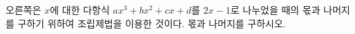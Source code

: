 \noindent\begin{minipage}[t]{0.6\linewidth}\vspace{0pt}\raggedright 오른쪽은 $x$에 대한 다항식 $ax^3+bx^2+cx+d$를 $2x-1$로 나누었을 때의 몫과 나머지를 구하기 위하여 조립제법을 이용한 것이다. 몫과 나머지를 구하시오.\end{minipage}\hfill\begin{minipage}[t]{0.37\linewidth}\vspace{0pt}\end{minipage}
